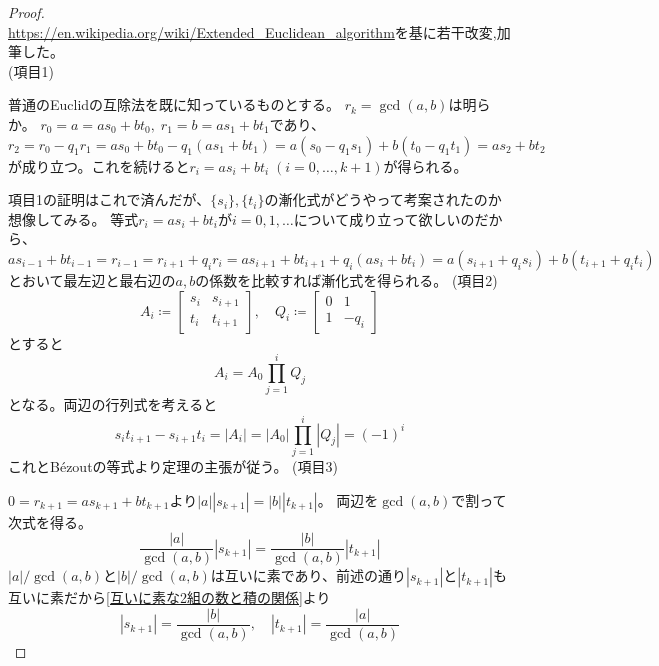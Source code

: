         \begin{proof}
            \quad\\
            \url{https://en.wikipedia.org/wiki/Extended_Euclidean_algorithm}を基に若干改変,加筆した。\\
            (項目1)
            \par
            普通のEuclidの互除法を既に知っているものとする。
            $r_k = \gcd(a,b)$は明らか。
            $r_0 = a = as_0 + bt_0,\;r_1 = b = as_1 + bt_1$であり、$r_2 = r_0 - q_1r_1 = as_0 + bt_0 - q_1(as_1 + bt_1) = a(s_0 - q_1s_1) + b(t_0 - q_1t_1) = as_2 + bt_2$が成り立つ。これを続けると$r_i = as_i + bt_i\;(i=0,\dotsc,k+1)$が得られる。
            \par
            項目1の証明はこれで済んだが、$\{s_i\},\{t_i\}$の漸化式がどうやって考案されたのか想像してみる。
            等式$r_i = as_i + bt_i$が$i=0,1,\dotsc$について成り立って欲しいのだから、$as_{i-1} + bt_{i-1} = r_{i-1} = r_{i+1} + q_ir_i = as_{i+1} + bt_{i+1} + q_i(as_i + bt_i) = a(s_{i+1} + q_is_i) + b(t_{i+1} + q_it_i)$とおいて最左辺と最右辺の$a,b$の係数を比較すれば漸化式を得られる。
            \newline
            (項目2)
            \[
                A_i \coloneq \begin{bmatrix}
                    s_i & s_{i+1} \\
                    t_i & t_{i+1}
                \end{bmatrix},\quad
                Q_i \coloneq \begin{bmatrix}
                    0 & 1 \\
                    1 & -q_i
                \end{bmatrix}
            \]
            とすると
            \[
                A_i = A_0 \prod_{j=1}^i Q_j
            \]
            となる。両辺の行列式を考えると
            \[ s_it_{i+1} - s_{i+1}t_i = |A_i| = |A_0|\prod_{j=1}^i|Q_j| = (-1)^i \]
            これとB\'ezoutの等式より定理の主張が従う。
            \newline
            (項目3)
            \par
            $0 = r_{k+1} = as_{k+1} + bt_{k+1}$より$|a||s_{k+1}| = |b||t_{k+1}|$。
            両辺を$\gcd(a,b)$で割って次式を得る。
            \[ \frac{|a|}{\gcd(a,b)}|s_{k+1}| = \frac{|b|}{\gcd(a,b)}|t_{k+1}| \]
            $|a|/\gcd(a,b)$と$|b|/\gcd(a,b)$は互いに素であり、前述の通り$|s_{k+1}|$と$|t_{k+1}|$も互いに素だから\ref{互いに素な2組の数と積の関係}より
            \[ |s_{k+1}| = \frac{|b|}{\gcd(a,b)},\quad |t_{k+1}| = \frac{|a|}{\gcd(a,b)} \]

\end{proof}
